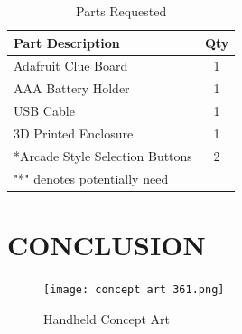 \documentclass[12pt]{article}
\begin{document}



 

\begin{table}[ht]
  \caption{Parts Requested}
  \label{table:parts_list}
  \begin{center}
  \begin{tabular}{|p{3in}|c|}
  
  \hline
  Part Description & Qty\\
  \hline
  \hline
  Adafruit Clue Board & 1 \\
  \hline
  AAA Battery Holder & 1 \\
  \hline
  USB Cable & 1 \\
  \hline
  3D Printed Enclosure & 1 \\
  \hline
  *Arcade Style Selection Buttons & 2\\
  \hline
  "*" denotes potentially need &\\
  \hline
  \end{tabular}
  \end{center}
  \end{table}


\newpage
\section{CONCLUSION}
\begin{figure}[!t]
\centering
\texttt{[image: concept art 361.png]}
\caption{Handheld Concept Art}
\label{fig:cpx}
\end{figure}
\end{document}
